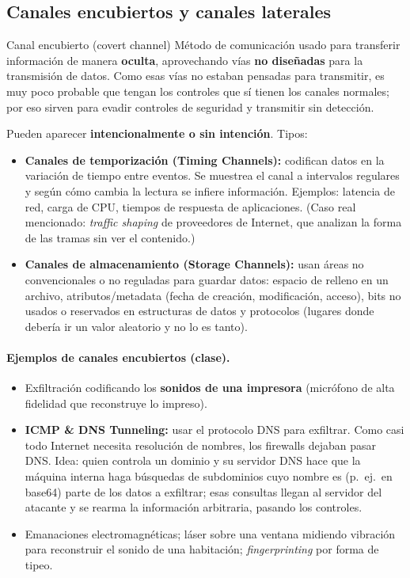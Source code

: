 \documentclass[../main.tex]{subfiles}
\begin{document}
\subsection{Canales encubiertos y canales laterales}

\begin{definicion}{Canal encubierto (covert channel)}
Método de comunicación usado para transferir información de manera \textbf{oculta},
aprovechando vías \textbf{no diseñadas} para la transmisión de datos. Como esas
vías no estaban pensadas para transmitir, es muy poco probable que tengan los
controles que sí tienen los canales normales; por eso sirven para evadir
controles de seguridad y transmitir sin detección.
\end{definicion}

Pueden aparecer \textbf{intencionalmente o sin intención}. Tipos:

\begin{itemize}
  \item \textbf{Canales de temporización (Timing Channels):} codifican datos en
        la variación de tiempo entre eventos. Se muestrea el canal a intervalos
        regulares y según cómo cambia la lectura se infiere información. Ejemplos:
        latencia de red, carga de CPU, tiempos de respuesta de aplicaciones.
        (Caso real mencionado: \textit{traffic shaping} de proveedores de Internet,
        que analizan la forma de las tramas sin ver el contenido.)
  \item \textbf{Canales de almacenamiento (Storage Channels):} usan áreas no
        convencionales o no reguladas para guardar datos: espacio de relleno en un
        archivo, atributos/metadata (fecha de creación, modificación, acceso),
        bits no usados o reservados en estructuras de datos y protocolos (lugares
        donde debería ir un valor aleatorio y no lo es tanto).
\end{itemize}

\paragraph{Ejemplos de canales encubiertos (clase).}
\begin{itemize}[noitemsep]
  \item Exfiltración codificando los \textbf{sonidos de una impresora} (micrófono
        de alta fidelidad que reconstruye lo impreso).
  \item \textbf{ICMP \& DNS Tunneling:} usar el protocolo DNS para exfiltrar. Como
        casi todo Internet necesita resolución de nombres, los firewalls dejaban
        pasar DNS. Idea: quien controla un dominio y su servidor DNS hace que la
        máquina interna haga búsquedas de subdominios cuyo nombre es (p.\ ej.\ en
        base64) parte de los datos a exfiltrar; esas consultas llegan al servidor
        del atacante y se rearma la información arbitraria, pasando los controles.
  \item Emanaciones electromagnéticas; láser sobre una ventana midiendo vibración
        para reconstruir el sonido de una habitación; \textit{fingerprinting} por
        forma de tipeo.
\end{itemize}
\end{document}
